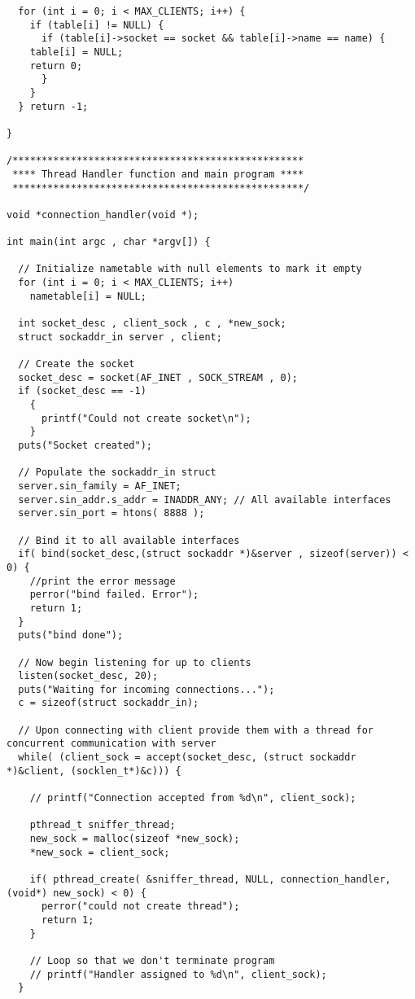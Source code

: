 \documentclass[titlepage, 14pt]{article}
\begin{document}
\begin{verbatim}
  for (int i = 0; i < MAX_CLIENTS; i++) {
    if (table[i] != NULL) {
      if (table[i]->socket == socket && table[i]->name == name) {
	table[i] = NULL;
	return 0;
      }
    }
  } return -1;
  
}
	    
/**************************************************
 **** Thread Handler function and main program ****
 **************************************************/

void *connection_handler(void *);

int main(int argc , char *argv[]) {

  // Initialize nametable with null elements to mark it empty
  for (int i = 0; i < MAX_CLIENTS; i++) 
    nametable[i] = NULL;
  
  int socket_desc , client_sock , c , *new_sock;
  struct sockaddr_in server , client;
  
  // Create the socket
  socket_desc = socket(AF_INET , SOCK_STREAM , 0);
  if (socket_desc == -1)
    {
      printf("Could not create socket\n");
    }
  puts("Socket created");
  
  // Populate the sockaddr_in struct
  server.sin_family = AF_INET;
  server.sin_addr.s_addr = INADDR_ANY; // All available interfaces
  server.sin_port = htons( 8888 );
  
  // Bind it to all available interfaces
  if( bind(socket_desc,(struct sockaddr *)&server , sizeof(server)) < 0) {
    //print the error message
    perror("bind failed. Error");
    return 1;
  }
  puts("bind done");
  
  // Now begin listening for up to clients
  listen(socket_desc, 20);
  puts("Waiting for incoming connections...");
  c = sizeof(struct sockaddr_in);
  
  // Upon connecting with client provide them with a thread for concurrent communication with server
  while( (client_sock = accept(socket_desc, (struct sockaddr *)&client, (socklen_t*)&c))) {
    
    // printf("Connection accepted from %d\n", client_sock);
    
    pthread_t sniffer_thread;
    new_sock = malloc(sizeof *new_sock);
    *new_sock = client_sock;
    
    if( pthread_create( &sniffer_thread, NULL, connection_handler, (void*) new_sock) < 0) {
      perror("could not create thread");
      return 1;
    }
    
    // Loop so that we don't terminate program
    // printf("Handler assigned to %d\n", client_sock);
  }
  

\end{verbatim}
\end{document}

